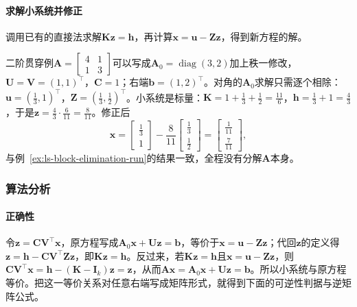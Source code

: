 \paragraph{求解小系统并修正}
调用已有的直接法求解$\bm K\bm z=\bm h$，再计算$\bm x=\bm u-\bm Z\bm z$，得到新方程的解。

\begin{example}[秩一更新的计算]
\label{ex:ls-woodbury-rank-one}
二阶贯穿例$\bm A=\left[\begin{smallmatrix}4&1\\1&3\end{smallmatrix}\right]$可以写成$\bm A_0=\operatorname{diag}(3,2)$加上秩一修改，$\bm U=\bm V=(1,1)^\top$，$\bm C=1$；右端$\bm b=(1,2)^\top$。对角的$\bm A_0$求解只需逐个相除：$\bm u=(\tfrac13,1)^\top$，$\bm Z=(\tfrac13,\tfrac12)^\top$。小系统是标量：$\bm K=1+\tfrac13+\tfrac12=\tfrac{11}6$，$\bm h=\tfrac13+1=\tfrac43$，于是$\bm z=\tfrac43\cdot\tfrac6{11}=\tfrac8{11}$。修正后
\[
 \bm x=\begin{bmatrix}\tfrac13\\1\end{bmatrix}-\frac8{11}\begin{bmatrix}\tfrac13\\\tfrac12\end{bmatrix}
 =\begin{bmatrix}\tfrac1{11}\\\tfrac7{11}\end{bmatrix},
\]
与例~\ref{ex:ls-block-elimination-run}的结果一致，全程没有分解$\bm A$本身。
\end{example}

\subsubsection{算法分析}
\paragraph{正确性}
令$\bm z=\bm C\bm V^\top\bm x$，原方程写成$\bm A_0\bm x+\bm U\bm z=\bm b$，等价于$\bm x=\bm u-\bm Z\bm z$；代回$\bm z$的定义得$\bm z=\bm h-\bm C\bm V^\top\bm Z\bm z$，即$\bm K\bm z=\bm h$。反过来，若$\bm K\bm z=\bm h$且$\bm x=\bm u-\bm Z\bm z$，则$\bm C\bm V^\top\bm x=\bm h-(\bm K-\bm I_k)\bm z=\bm z$，从而$\bm A\bm x=\bm A_0\bm x+\bm U\bm z=\bm b$。所以小系统与原方程等价。把这一等价关系对任意右端写成矩阵形式，就得到下面的可逆性判据与逆矩阵公式。

